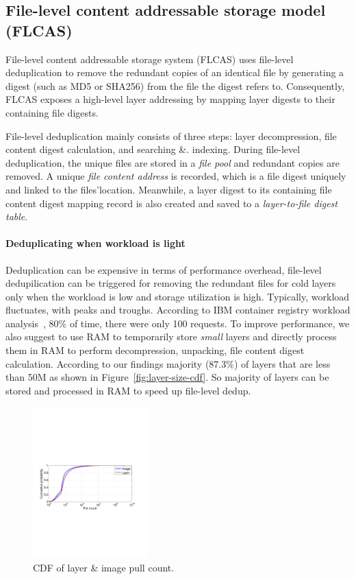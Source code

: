 \subsection{File-level content addressable storage model (FLCAS)}
File-level content addressable storage system (FLCAS) uses file-level
deduplication to remove the redundant copies of an identical file by generating
a digest (such as MD5 or SHA256) from the file the digest refers to.
Consequently, FLCAS exposes a high-level layer addressing by mapping layer
digests to their containing file digests. 

File-level deduplication mainly consists of three
steps: layer decompression, file content digest calculation, and searching \&.
indexing.  
During file-level deduplication, the unique files are stored in a
\textit{file pool} and redundant copies are removed. A unique \textit{file
content address} is recorded, which is a file digest uniquely and linked to the
files'location. Meanwhile, a layer digest to its containing file content digest
mapping record is also created and saved to a \textit{layer-to-file digest
table}.     

\paragraph{Deduplicating when workload is light}



Deduplication can be expensive in terms of performance overhead, file-level
dedupilication can be triggered for removing the redundant files for cold
layers only when the workload is low and storage utilization is high.  
Typically,
workload fluctuates, with peaks and troughs. According to IBM container
registry workload analysis~\cite{dockerworkload}, 80\% of time, there were only 100
requests.
To improve performance, we also suggest to use
RAM to temporarily store \textit{small} layers and directly process them in RAM
to perform decompression, unpacking, file content digest calculation.
According to our findings majority (87.3\%) of layers that are less than 50M as
shown in Figure~\ref{fig:layer-size-cdf}. So majority of layers can be stored
and processed in RAM to speed up file-level dedup. 

\begin{figure}
	\centering
	\includegraphics[width=0.4\textwidth]{graphs/pull-cnt.pdf}
	\caption{CDF of layer \& image pull count.
	}
	\label{fig:pull-cnt}
\end{figure}

